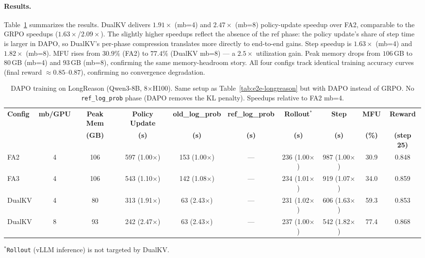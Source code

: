 \documentclass{article}
\begin{document}
\paragraph{Results.} Table~\ref{tab:dapo-longreason} summarizes the results. DualKV delivers $1.91\times$ (mb=4) and $2.47\times$ (mb=8) policy-update speedup over FA2, comparable to the GRPO speedups ($1.63\times$/$2.09\times$). The slightly higher speedups reflect the absence of the ref phase: the policy update's share of step time is larger in DAPO, so DualKV's per-phase compression translates more directly to end-to-end gains. Step speedup is $1.63\times$ (mb=4) and $1.82\times$ (mb=8). MFU rises from $30.9\%$ (FA2) to $77.4\%$ (DualKV mb=8) --- a $2.5\times$ utilization gain. Peak memory drops from $106$\,GB to $80$\,GB (mb=4) and $93$\,GB (mb=8), confirming the same memory-headroom story. All four configs track identical training accuracy curves (final reward $\approx 0.85$--$0.87$), confirming no convergence degradation.

\begin{table}[ht]
\centering
\scriptsize
\setlength{\tabcolsep}{3pt}
\caption{DAPO training on LongReason (Qwen3-8B, 8$\times$H100). Same setup as Table~\ref{tab:e2e-longreason} but with DAPO instead of GRPO. No \texttt{ref\_log\_prob} phase (DAPO removes the KL penalty). Speedups relative to FA2 mb=4.}
\label{tab:dapo-longreason}
\begin{tabular}{@{}lc c c c c c c c c@{}}
\toprule
\textbf{Config} & \textbf{mb/GPU} & \textbf{Peak Mem} & \textbf{Policy Update} & \textbf{old\_log\_prob} & \textbf{ref\_log\_prob} & \textbf{Rollout$^{*}$} & \textbf{Step} & \textbf{MFU} & \textbf{Reward} \\
 & & \textbf{(GB)} & \textbf{(s)} & \textbf{(s)} & \textbf{(s)} & \textbf{(s)} & \textbf{(s)} & \textbf{(\%)} & \textbf{(step 25)} \\
\midrule
FA2      & 4 & 106 & 597 (1.00$\times$) & 153 (1.00$\times$) & --- & 236 (1.00$\times$) & 987 (1.00$\times$) & 30.9 & 0.848 \\
FA3      & 4 & 106 & 543 (1.10$\times$) & 142 (1.08$\times$) & --- & 234 (1.01$\times$) & 919 (1.07$\times$) & 34.0 & 0.859 \\
DualKV   & 4 &  80 & 313 (1.91$\times$) &  63 (2.43$\times$) & --- & 231 (1.02$\times$) & 606 (1.63$\times$) & 59.3 & 0.853 \\
DualKV   & 8 &  93 & 242 (2.47$\times$) &  63 (2.43$\times$) & --- & 237 (1.00$\times$) & 542 (1.82$\times$) & 77.4 & 0.868 \\
\bottomrule
\end{tabular}
\vspace{2pt}

{\scriptsize $^{*}$\texttt{Rollout} (vLLM inference) is not targeted by DualKV.}
\end{table}
\end{document}

